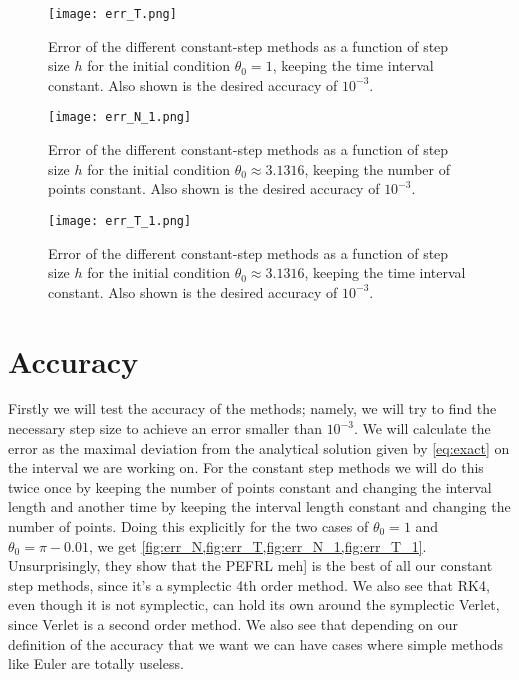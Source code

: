 \documentclass[10pt,a4paper,twocolumn]{article}
\begin{document}
\begin{figure}
    \centering
    \captionsetup{justification=centering}
    \texttt{[image: err\_T.png]}
    \caption{Error of the different constant-step methods as a function of step size $h$ for the initial condition $\theta_0 = 1$, keeping the time interval constant. Also shown is the desired accuracy of $10^{-3}$.}
    \label{fig:err_T}
\end{figure}

\begin{figure}
    \centering
    \captionsetup{justification=centering}
    \texttt{[image: err\_N\_1.png]}
    \caption{Error of the different constant-step methods as a function of step size $h$ for the initial condition $\theta_0 \approx 3.1316$, keeping the number of points constant. Also shown is the desired accuracy of $10^{-3}$.}
    \label{fig:err_N_1}
\end{figure}

\begin{figure}
    \centering
    \captionsetup{justification=centering}
    \texttt{[image: err\_T\_1.png]}
    \caption{Error of the different constant-step methods as a function of step size $h$ for the initial condition $\theta_0 \approx 3.1316$, keeping the time interval constant. Also shown is the desired accuracy of $10^{-3}$.}
    \label{fig:err_T_1}
\end{figure}

\section{Accuracy}

Firstly we will test the accuracy of the methods; namely, we will try to find the necessary step size to achieve an error smaller than $10^{-3}$. We will calculate the error as the maximal deviation from the analytical solution given by \cref{eq:exact} on the interval we are working on. For the constant step methods we will do this twice once by keeping the number of points constant and changing the interval length and another time by keeping the interval length constant and changing the number of points. Doing this explicitly for the two cases of $\theta_0 = 1$ and $\theta_0 = \pi - 0.01$, we get \cref{fig:err_N,fig:err_T,fig:err_N_1,fig:err_T_1}. Unsurprisingly, they show that the PEFRL meh] is the best of all our constant step methods, since it's a symplectic 4th order method. We also see that RK4, even though it is not symplectic, can hold its own around the symplectic Verlet, since Verlet is a second order method. We also see that depending on our definition of the accuracy that we want we can have cases where simple methods like Euler are totally useless.
\end{document}
